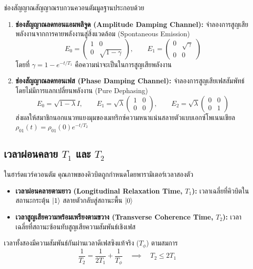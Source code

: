 ช่องสัญญาณสัญญาณรบกวนควอนตัมมูลฐานประกอบด้วย
\begin{enumerate}
    \item \textbf{ช่องสัญญาณลดทอนแอมพลิจูด (Amplitude Damping Channel):} จำลองการสูญเสียพลังงานจากการคายพลังงานสู่สิ่งแวดล้อม (Spontaneous Emission)
    \begin{equation}
    E_0 = \begin{pmatrix} 1 & 0 \\ 0 & \sqrt{1 - \gamma} \end{pmatrix}, \qquad E_1 = \begin{pmatrix} 0 & \sqrt{\gamma} \\ 0 & 0 \end{pmatrix}
    \end{equation}
    โดยที่ $\gamma = 1 - e^{-t/T_1}$ คือความน่าจะเป็นในการสูญเสียพลังงาน
    \item \textbf{ช่องสัญญาณลดทอนเฟส (Phase Damping Channel):} จำลองการสูญเสียเฟสสัมพัทธ์โดยไม่มีการแลกเปลี่ยนพลังงาน (Pure Dephasing)
    \begin{equation}
    E_0 = \sqrt{1 - \lambda} I, \qquad E_1 = \sqrt{\lambda} \begin{pmatrix} 1 & 0 \\ 0 & 0 \end{pmatrix}, \qquad E_2 = \sqrt{\lambda} \begin{pmatrix} 0 & 0 \\ 0 & 1 \end{pmatrix}
    \end{equation}
    ส่งผลให้สมาชิกนอกแนวทแยงมุมของเมทริกซ์ความหนาแน่นสลายตัวแบบเอกซ์โพเนนเชียล $\rho_{01}(t) = \rho_{01}(0) e^{-t/T_2}$
\end{enumerate}

\subsection{เวลาผ่อนคลาย $T_1$ และ $T_2$}
ในฮาร์ดแวร์ควอนตัม คุณภาพของคิวบิตถูกกำหนดโดยพารามิเตอร์เวลาสองตัว
\begin{itemize}
    \item \textbf{เวลาผ่อนคลายตามยาว (Longitudinal Relaxation Time, $T_1$):} เวลาเฉลี่ยที่คิวบิตในสถานะกระตุ้น $\ket{1}$ สลายตัวกลับสู่สถานะพื้น $\ket{0}$
    \item \textbf{เวลาสูญเสียความพร้อมเพรียงตามขวาง (Transverse Coherence Time, $T_2$):} เวลาเฉลี่ยที่สถานะซ้อนทับสูญเสียความสัมพันธ์เชิงเฟส
\end{itemize}
เวลาทั้งสองมีความสัมพันธ์กันผ่านเวลาดีเฟสซิงแท้จริง ($T_\phi$) ตามสมการ
\begin{equation}
\frac{1}{T_2} = \frac{1}{2 T_1} + \frac{1}{T_\phi} \quad \implies \quad T_2 \le 2 T_1
\label{eq:t1_t2_relation}
\end{equation}

